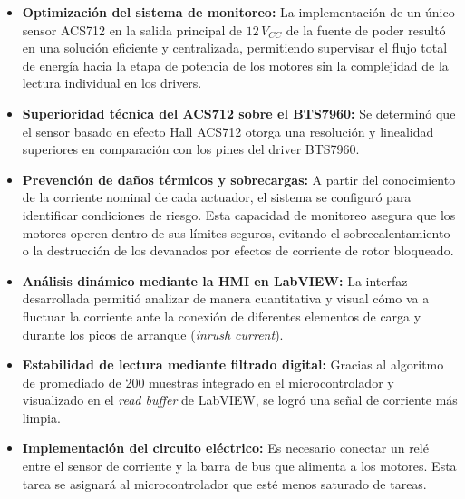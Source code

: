 \clearpage
\begin{resultadosFase}
	\begin{itemize}
		
		\item \textbf{Optimización del sistema de monitoreo:} La implementación de un único sensor ACS712 en la salida principal de $12\,V_{CC}$ de la fuente de poder resultó en una solución eficiente y centralizada, permitiendo supervisar el flujo total de energía hacia la etapa de potencia de los motores sin la complejidad de la lectura individual en los drivers.
		
		\item \textbf{Superioridad técnica del ACS712 sobre el BTS7960:} Se determinó que el sensor basado en efecto Hall ACS712 otorga una resolución y linealidad superiores en comparación con los pines del driver BTS7960. 
		
		\item \textbf{Prevención de daños térmicos y sobrecargas:} A partir del conocimiento de la corriente nominal de cada actuador, el sistema se configuró para identificar condiciones de riesgo. Esta capacidad de monitoreo asegura que los motores operen dentro de sus límites seguros, evitando el sobrecalentamiento o la destrucción de los devanados por efectos de corriente de rotor bloqueado.
		
		\item \textbf{Análisis dinámico mediante la HMI en LabVIEW:} La interfaz desarrollada permitió analizar de manera cuantitativa y visual cómo va a fluctuar la corriente ante la conexión de diferentes elementos de carga y durante los picos de arranque (\textit{inrush current}). 
		
		\item \textbf{Estabilidad de lectura mediante filtrado digital:} Gracias al algoritmo de promediado de 200 muestras integrado en el microcontrolador y visualizado en el \textit{read buffer} de LabVIEW, se logró una señal de corriente más limpia.
		
		\item \textbf{Implementación del circuito eléctrico:} Es necesario conectar un relé entre el sensor de corriente y la barra de bus que alimenta a los motores. Esta tarea se asignará al microcontrolador que esté menos saturado de tareas.
	\end{itemize}
\end{resultadosFase}
